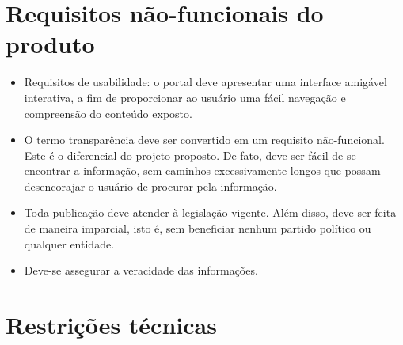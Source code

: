 \documentclass[12pt, a4paper]{article}
\begin{document}
    \section{Requisitos não-funcionais do produto}
    \begin{itemize}
    \item Requisitos de usabilidade: o portal deve apresentar uma interface
        amigável interativa, a fim de proporcionar ao usuário uma fácil
        navegação e compreensão do conteúdo exposto.
    \item O termo transparência deve ser convertido em um requisito
        não-funcional. Este é o diferencial do projeto proposto. De fato, deve
        ser fácil de se encontrar a informação, sem caminhos excessivamente
        longos que possam desencorajar o usuário de procurar pela informação.
    \item Toda publicação deve atender à legislação vigente. Além disso, deve
        ser feita de maneira imparcial, isto é, sem beneficiar nenhum partido
        político ou qualquer entidade.
    \item Deve-se assegurar a veracidade das informações.
    \end{itemize}

    \section{Restrições técnicas}
\end{document}
